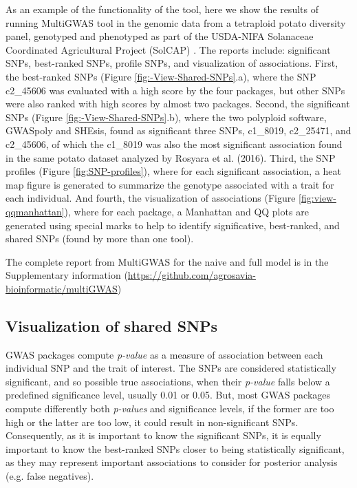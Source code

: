 \documentclass{article}
\begin{document}
As an example of the functionality of the tool, here we show the results of running MultiGWAS tool in the genomic data from a tetraploid potato diversity panel, genotyped and phenotyped as part of the USDA-NIFA Solanaceae Coordinated Agricultural Project (SolCAP) \cite{Hirsch2013}. The reports include: significant SNPs, best-ranked SNPs, profile SNPs, and visualization of associations. First, the best-ranked SNPs (Figure \ref{fig:-View-Shared-SNPs}.a), where the SNP c2\_45606 was evaluated with a high score by the four packages, but other SNPs were also ranked with high scores by almost two packages. Second, the significant SNPs (Figure \ref{fig:-View-Shared-SNPs}.b), where the two polyploid software, GWASpoly and SHEsis, found as significant three SNPs, c1\_8019, c2\_25471, and c2\_45606, of which the c1\_8019 was also the most significant association found in the same potato dataset analyzed by Rosyara et al. (2016). Third, the SNP profiles (Figure \ref{fig:SNP-profiles}), where for each significant association, a heat map figure is generated to summarize the genotype associated with a trait for each individual. And fourth, the visualization of associations (Figure \ref{fig:view-qqmanhattan}), where for each package, a Manhattan and QQ plots are generated using special marks to help to identify significative, best-ranked, and shared SNPs (found by more than one tool). 

The complete report from MultiGWAS for the naive and full model is in the Supplementary information (\url{https://github.com/agrosavia-bioinformatic/multiGWAS}) 



\subsection{Visualization of shared SNPs}
GWAS packages compute \emph{p-value }as a measure of association between each individual SNP and the trait of interest. The SNPs are considered statistically significant, and so possible true associations, when their \emph{p-value }falls below a predefined significance level, usually 0.01 or 0.05. But, most GWAS packages compute differently both \emph{p-values }and significance levels, if the former are too high or the latter are too low, it could result in non-significant SNPs. Consequently, as it is important to know the significant SNPs, it is equally important to know the best-ranked SNPs closer to being statistically significant, as they may represent important associations to consider for posterior analysis (e.g. false negatives).
\end{document}
